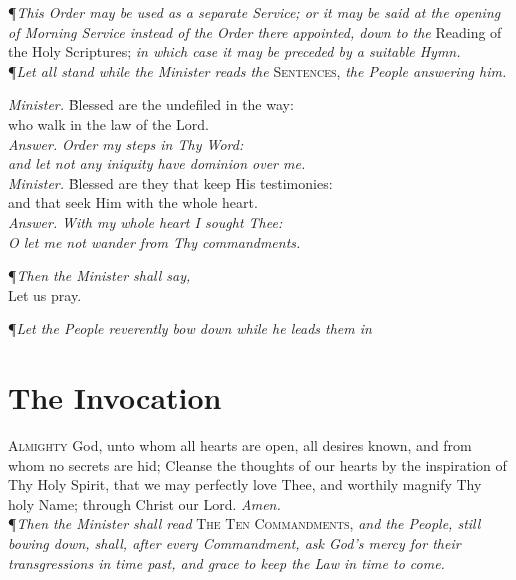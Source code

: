 \P \textit{This Order may be used as a separate Service; or it may be said at the opening of Morning Service instead of the Order there appointed, down to the} Reading of the Holy Scriptures; \textit{in which case it may be preceded by a suitable Hymn.} \\

\noindent\P\textit{Let all stand while the Minister reads the} \textsc{Sentences,} \textit{the People answering him.}     

\begin{tabbing}
	\textit{Minister.} \= Blessed are the undefiled in the way: \\
\> who walk in the law of the Lord. \\
	\textit{Answer.} \> \textit{Order my steps in Thy Word:} \\
\> \textit{and let not any iniquity have dominion over me.} \\
	\textit{Minister.} \= Blessed are they that keep His testimonies: \\
\> and that seek Him with the whole heart. \\
	\textit{Answer.} \> \textit{With my whole heart I sought Thee:} \\
\> \textit{O let me not wander from Thy commandments.} \\
\end{tabbing}

{\centering \P\textit{Then the Minister shall say,} \\ Let us pray. \par}
\vspace{2ex}
\noindent\P\textit{Let the People reverently bow down while he leads them in}

\section*{The Invocation}

\lettrine{A}{lmighty} God, unto whom all hearts are open, all desires known, and from whom no secrets are hid; Cleanse the thoughts of our hearts by the inspiration of Thy Holy Spirit, that we may perfectly love Thee, and worthily magnify Thy holy Name; through Christ our Lord.
\textit{Amen.} \\

\noindent\P\textit{Then the Minister shall read} \textsc{The Ten Commandments,} \textit{and the People, still bowing down, shall, after every Commandment, ask God's mercy for their transgressions in time past, and grace to keep the Law in time to come.} \\

